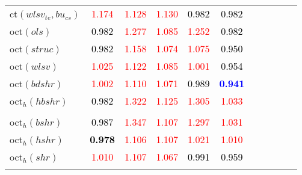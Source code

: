 \begin{tabular}[t]{l|>{}cccc>{}c|ccccc}
ct$(wlsv_{te}, bu_{cs})$ & \textcolor{red}{1.174} & \textcolor{red}{1.128} & \textcolor{red}{1.130} & \textcolor{black}{0.982} & \textcolor{black}{0.982} &  &  &  &  & \\
oct$(ols)$ & \textcolor{black}{0.982} & \textcolor{red}{1.277} & \textcolor{red}{1.085} & \textcolor{red}{1.252} & \textcolor{black}{0.982} &  &  &  &  & \\
oct$(struc)$ & \textcolor{black}{0.982} & \textcolor{red}{1.158} & \textcolor{red}{1.074} & \textcolor{red}{1.075} & \textcolor{black}{0.950} &  &  &  &  & \\
oct$(wlsv)$ & \textcolor{red}{1.025} & \textcolor{red}{1.122} & \textcolor{red}{1.085} & \textcolor{red}{1.001} & \textcolor{black}{0.954} &  &  &  &  & \\
oct$(bdshr)$ & \textcolor{red}{1.002} & \textcolor{red}{1.110} & \textcolor{red}{1.071} & \textcolor{black}{0.989} & \textcolor{blue}{\textbf{0.941}} &  &  &  &  & \\
oct$_h(hbshr)$ & \textcolor{black}{0.982} & \textcolor{red}{1.322} & \textcolor{red}{1.125} & \textcolor{red}{1.305} & \textcolor{red}{1.033} &  &  &  &  & \\[-1.5ex]
\hline\\[-1.5ex]
oct$_h(bshr)$ & \textcolor{black}{0.987} & \textcolor{red}{1.347} & \textcolor{red}{1.107} & \textcolor{red}{1.297} & \textcolor{red}{1.031} &  &  &  &  & \\
oct$_h(hshr)$ & \textcolor{black}{\textbf{0.978}} & \textcolor{red}{1.106} & \textcolor{red}{1.107} & \textcolor{red}{1.021} & \textcolor{red}{1.010} &  &  &  &  & \\
oct$_h(shr)$ & \textcolor{red}{1.010} & \textcolor{red}{1.107} & \textcolor{red}{1.067} & \textcolor{black}{0.991} & \textcolor{black}{0.959} &  &  &  &  & \\
\bottomrule
{}\\
\end{tabular}
